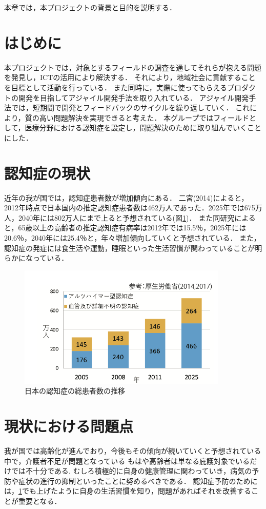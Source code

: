 \documentclass[../report]{subfiles}
\begin{document}
本章では，本プロジェクトの背景と目的を説明する．

\section{はじめに} \label{sec:hazimeni}
本プロジェクトでは，対象とするフィールドの調査を通してそれらが抱える問題を発見し，ICTの活用により解決する．
それにより，地域社会に貢献することを目標として活動を行っている．
また同時に，実際に使ってもらえるプロダクトの開発を目指してアジャイル開発手法を取り入れている．
アジャイル開発手法では，短期間で開発とフィードバックのサイクルを繰り返していく．
これにより，質の高い問題解決を実現できると考えた．
本グループではフィールドとして，医療分野における認知症を設定し，問題解決のために取り組んでいくことにした．

\section{認知症の現状} \label{sec:genzyou}
近年の我が国では，認知症患者数が増加傾向にある．
二宮(2014)によると，2012年時点で日本国内の推定認知症患者数は462万人であった\cite{syourai}．2025年では675万人，2040年には802万人にまで上ると予想されている(図\ref{fig:ninchisyo-graph})．
また同研究によると，65歳以上の高齢者の推定認知症有病率は2012年では15.5％，2025年には20.6％，2040年には25.4％と，年々増加傾向していくと予想されている\cite{syourai}．
また，認知症の発症には食生活や運動，睡眠といった生活習慣が関わっていることが明らかになっている\cite{seikatsu}．
\begin{figure}[htbp]
    \begin{center}
        \includegraphics[width=10cm]{imgs/ninchisyo-graph.png}
        \caption{日本の認知症の総患者数の推移}
        \label{fig:ninchisyo-graph}
    \end{center}
\end{figure}

\section{現状における問題点} \label{sec:mondai}
我が国では高齢化が進んでおり，今後もその傾向が続いていくと予想されている中で，介護者不足が問題となっている
もはや高齢者は単なる庇護対象でいるだけでは不十分である\cite{kaigo}.
むしろ積極的に自身の健康管理に関わっていき，病気の予防や症状の進行の抑制といったことに努めるべきである．
認知症予防のためには，\ref{sec:hazimeni}でも上げたように自身の生活習慣を知り，問題があればそれを改善することが重要となる．
\end{document}

